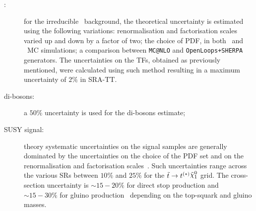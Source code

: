\begin{description}
				\item [\boldmath \ttV :] for the irreducible \ttV\ background, the theoretical uncertainty is estimated using the following variations: renormalisation and factorisation scales varied up and down by a factor of two; the choice of \ac{PDF}, in both \ttV\ and \ttgamma\ \ac{MC} simulations; a comparison between \texttt{MC@NLO} and \texttt{OpenLoops+SHERPA} generators. The uncertainties on the \acp{TF}, obtained as previously mentioned, were calculated using such method resulting in a maximum uncertainty of $2\%$ in SRA-TT.

				\item [di-bosons:] a $50\%$ uncertainty is used for the di-bosons estimate;

				\item [SUSY signal:] theory systematic uncertainties on the signal samples are generally dominated by the uncertainties on the choice of the \ac{PDF} set and on the renormalisation and factorisation scales~\cite{Beenakker2011}. Such uncertainties range across the various \acp{SR} between $10\%$ and $25\%$ for the $\stop\to t^{(*)} \ninoone$ grid. %
				The cross-section uncertainty is $\sim15-20\%$ for direct stop production and $\sim15-30\%$ for gluino production~\cite{Beenakker:1997ut,Beenakker:2010nq,Beenakker:2011fu,Borschensky:2014cia} depending on the top-squark and gluino masses.
			\end{description}
